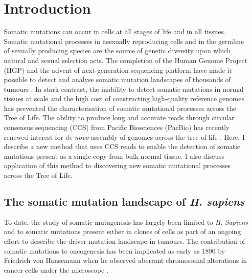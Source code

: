 
\chapter{Introduction}  %

\ifpdf
    \graphicspath{{Chapter1/Figs/Raster/}{Chapter1/Figs/PDF/}{Chapter1/Figs/}}
\else
    \graphicspath{{Chapter1/Figs/Vector/}{Chapter1/Figs/}}
\fi

Somatic mutations can occur in cells at all stages of life and in all tissues. Somatic mutational processes in asexually reproducing cells and in the germline of sexually producing species are the source of genetic diversity upon which natural and sexual selection acts. The completion of the Human Genome Project (HGP) \cite{Lander2001-du} and the advent of next-generation sequencing platform \cite{} have made it possible to detect and analyse somatic mutation landscapes of thousands of tumours \cite{Weinstein2013-ko, ICGCTCGA_Pan-Cancer_Analysis_of_Whole_Genomes_Consortium2020-ts}. In stark contrast, the inability to detect somatic mutations in normal tissues at scale and the high cost of constructing high-quality reference genomes has prevented the characterisation of somatic mutational processes across the Tree of Life. The ability to produce long and accurate reads through circular consensus sequencing (CCS) from Pacific Biosciences (PacBio) \cite{Wenger2019-pw} has recently renewed interest for \textit{de novo} assembly of genomes across the tree of life \cite{Darwin_Tree_of_Life_Project_Consortium2022-ma}. Here, I describe a new method that uses CCS reads to enable the detection of somatic mutations present as a single copy from bulk normal tissue. I also discuss application of this method to discovering new somatic mutational processes across the Tree of Life. 

\section{The somatic mutation landscape of \textit{H. sapiens}}

To date, the study of somatic mutagenesis has largely been limited to \textit{H. Sapiens} and to somatic mutations present either in clones of cells as part of an ongoing effort to describe the driver mutation landscape in tumours. The contribution of somatic mutations to oncogenesis has been implicated as early as 1890 by Friedrich von Hansemann when he observed aberrant chromosomal alterations in cancer cells under the microscope \cite{hansemann_1890}.  

